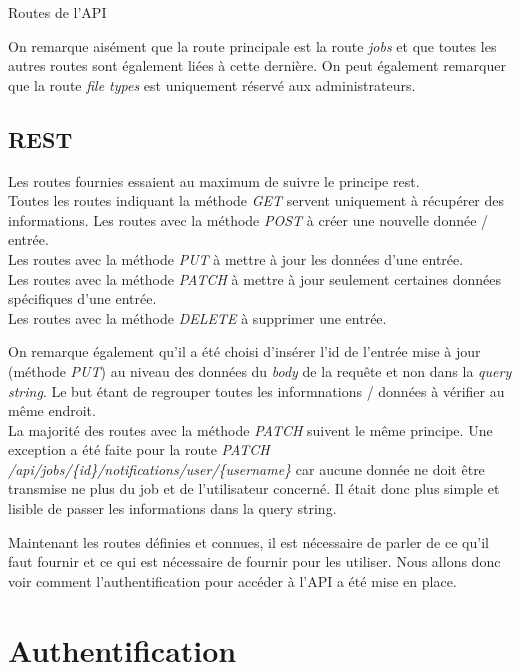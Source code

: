 \documentclass[
    iai, %
    il, %
]{heig-tb}
\begin{document}
\begin{listing}[h]
    \inputminted{php}{assets/code/api-2.php}
    \caption{Routes de l'API \label{routes-api-1}}
\end{listing}

On remarque aisément que la route principale est la route \emph{jobs} et que toutes les autres routes sont également liées à cette dernière. On peut également remarquer que la route \emph{file types} est uniquement réservé aux administrateurs.

\subsection{REST}
Les routes fournies essaient au maximum de suivre le principe \Gls{rest}. \\
Toutes les routes indiquant la méthode \emph{GET} servent uniquement à récupérer des informations.
Les routes avec la méthode \emph{POST} à créer une nouvelle donnée / entrée. \\
Les routes avec la méthode \emph{PUT} à mettre à jour les données d'une entrée. \\
Les routes avec la méthode \emph{PATCH} à mettre à jour seulement certaines données spécifiques d'une entrée. \\
Les routes avec la méthode \emph{DELETE} à supprimer une entrée.

On remarque également qu'il a été choisi d'insérer l'id de l'entrée mise à jour (méthode \emph{PUT}) au niveau des données du \emph{body} de la requête et non dans la \emph{query string}. Le but étant de regrouper toutes les informnations / données à vérifier au même endroit. \\
La majorité des routes avec la méthode \emph{PATCH} suivent le même principe. Une exception a été faite pour la route \emph{PATCH /api/jobs/\{id\}/notifications/user/\{username\}} car aucune donnée ne doit être transmise ne plus du job et de l'utilisateur concerné. Il était donc plus simple et lisible de passer les informations dans la query string.

Maintenant les routes définies et connues, il est nécessaire de parler de ce qu'il faut fournir et ce qui est nécessaire de fournir pour les utiliser. Nous allons donc voir comment l'authentification pour accéder à l'API a été mise en place.

\section{Authentification}
\end{document}
